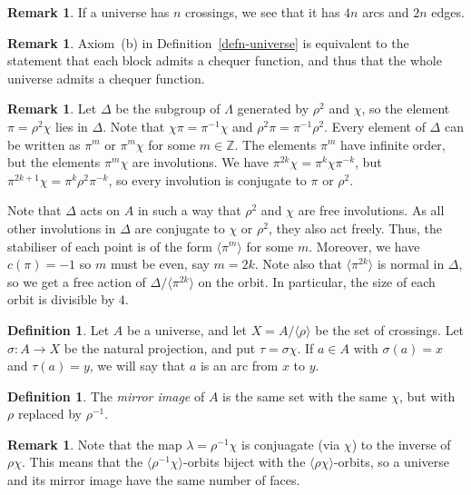 \documentclass{amsart}
\newcommand{\Z}         {{\mathbb{Z}}}
\newcommand{\Dl}        {\Delta}
\newcommand{\Lm}        {\Lambda}
\newcommand{\lm}        {\lambda}
\newcommand{\sg}        {\sigma}
\newcommand{\ip}[1]     {\langle #1\rangle}
\renewcommand{\:}{\colon}
\theoremstyle{definition}
\newtheorem{remark}[theorem]{Remark}
\newtheorem{definition}[theorem]{Definition}
\begin{document}
\begin{remark}
 If a universe has $n$ crossings, we see that it has $4n$ arcs and
 $2n$ edges.  
\end{remark}

\begin{remark}
 Axiom~(b) in Definition~\ref{defn-universe} is equivalent to the
 statement that each block admits a chequer function, and thus that
 the whole universe admits a chequer function.
\end{remark}

\begin{remark}\label{rem-dihedral}
 Let $\Dl$ be the subgroup of $\Lm$ generated by $\rho^2$ and $\chi$,
 so the element $\pi=\rho^2\chi$ lies in $\Dl$.  Note that
 $\chi\pi=\pi^{-1}\chi$ and $\rho^2\pi=\pi^{-1}\rho^2$.  Every element
 of $\Dl$ can be written as $\pi^m$ or $\pi^m\chi$ for some $m\in\Z$.
 The elements $\pi^m$ have infinite order, but the elements
 $\pi^m\chi$ are involutions.  We have
 $\pi^{2k}\chi=\pi^k\chi\pi^{-k}$, but
 $\pi^{2k+1}\chi=\pi^k\rho^2\pi^{-k}$, so every involution is
 conjugate to $\pi$ or $\rho^2$.

 Note that $\Dl$ acts on $A$ in such a way that $\rho^2$ and $\chi$
 are free involutions.  As all other involutions in $\Dl$ are
 conjugate to $\chi$ or $\rho^2$, they also act freely.  Thus, the
 stabiliser of each point is of the form $\ip{\pi^m}$ for some $m$.
 Moreover, we have $c(\pi)=-1$ so $m$ must be even, say $m=2k$.  Note
 also that $\ip{\pi^{2k}}$ is normal in $\Dl$, so we get a free action
 of $\Dl/\ip{\pi^{2k}}$ on the orbit.  In particular, the size of each
 orbit is divisible by $4$.
\end{remark}

\begin{definition}
 Let $A$ be a universe, and let $X=A/\ip{\rho}$ be the set of
 crossings.  Let $\sg\:A\to X$ be the natural projection, and put
 $\tau=\sg\chi$.  If $a\in A$ with $\sg(a)=x$ and $\tau(a)=y$, we will
 say that $a$ is an arc from $x$ to $y$.
\end{definition}

\begin{definition}
 The \emph{mirror image} of $A$ is the same set with the same $\chi$,
 but with $\rho$ replaced by $\rho^{-1}$.  
\end{definition}

\begin{remark}
 Note that the map $\lm=\rho^{-1}\chi$ is conjuagate (via $\chi$) to
 the inverse of $\rho\chi$.  This means that the
 $\ip{\rho^{-1}\chi}$-orbits biject with the $\ip{\rho\chi}$-orbits,
 so a universe and its mirror image have the same number of faces.
\end{remark}
\end{document}
